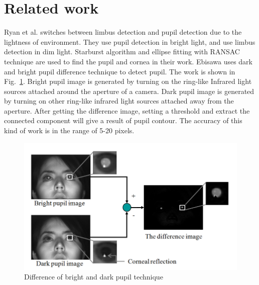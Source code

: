 \documentclass[sigconf]{acmart}
\begin{document}
\section{Related work}

Ryan et al.\cite{Ryan:2008:LSW:1344471.1344487} switches between limbus detection and pupil detection due to the lightness of environment. They use pupil detection in bright light, and use limbus detection in dim light. Starburst\cite{Li:2005:SHA:1099539.1099986} algorithm and ellipse fitting with RANSAC technique are used to find the pupil and cornea in their work. Ebisawa\cite{5068882} uses dark and bright pupil difference technique to detect pupil. The work is shown in Fig.~\ref{fig:Difference of bright and dark pupil technique}. Bright pupil image is generated by turning on the ring-like Infrared light sources attached around the aperture of a camera. Dark pupil image is generated by turning on other ring-like infrared light sources attached away from the aperture. After getting the difference image, setting a threshold and extract the connected component will give a result of pupil contour\cite{Morimoto2000331}. The accuracy of this kind of work is in the range of 5-20 pixels.

\begin{figure}
\begin{minipage}[b]{1.0\linewidth}
  \centering
  \centerline{\includegraphics[scale=0.3]{../Fig/Dark_bright_pupil_difference_technique.png}}
\end{minipage}
\caption{Difference of bright and dark pupil technique\cite{5068882}}
\label{fig:Difference of bright and dark pupil technique}
\end{figure}
\end{document}

